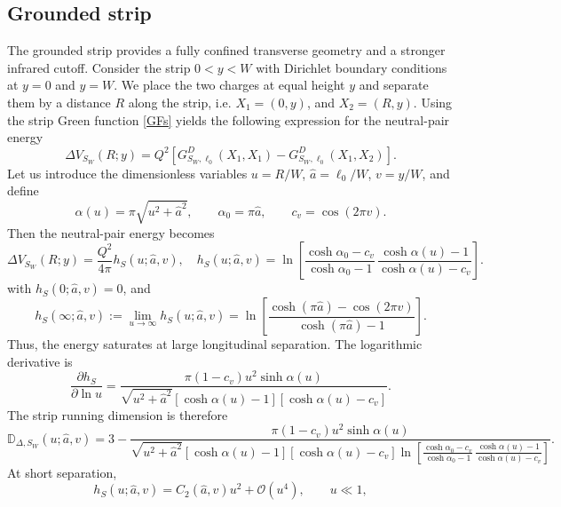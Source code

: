 \documentclass[openacc]{rsproca_new}%
\begin{document}
\subsection{Grounded strip}
\label{subsec:running_dimension_strip}

The grounded strip provides a fully confined transverse geometry and a stronger infrared cutoff. Consider the strip $0<y<W$ with Dirichlet boundary conditions at $y=0$ and $y=W$. We place the two charges at equal height $y$ and separate them by a distance $R$ along the strip, i.e. $X_1=(0,y)$, and $X_2=(R,y)$. Using the strip Green function \eqref{GFs} yields the following expression for the neutral-pair energy
\begin{equation}
  \Delta V_{S_W}(R;y)=Q^2\left[G_{S_W,\ell_0}^D(X_1,X_1)-G_{S_W,\ell_0}^D(X_1,X_2)\right].
\end{equation}
Let us introduce the dimensionless variables $u=R/W$, $\widehat{a}=\ell_0/W$, $v=y/W$, and define
\begin{equation}
  \alpha(u) = \pi\sqrt{u^2+\widehat{a}^2}, \qquad \alpha_0 = \pi \widehat{a},\qquad c_v = \cos(2\pi v).
\end{equation}
Then the neutral-pair energy becomes
\begin{equation}
  \Delta V_{S_W}(R;y)=\frac{Q^2}{4\pi}h_S(u;\widehat{a},v),\quad h_S(u;\widehat{a},v)=\ln\left[\frac{\cosh\alpha_0-c_v}{\cosh\alpha_0-1}\,\frac{\cosh\alpha(u)-1}{\cosh\alpha(u)-c_v}\right].
\end{equation}
with $h_S(0;\widehat{a},v)=0$, and
\begin{equation}
  h_S(\infty;\widehat{a},v):=\lim_{u\to\infty}h_S(u;\widehat{a},v)=\ln\left[\frac{\cosh(\pi \widehat{a})-\cos(2\pi v)}{\cosh(\pi \widehat{a})-1}\right].
\end{equation}
Thus, the energy saturates at large longitudinal separation. The logarithmic derivative is
\begin{equation}
  \frac{\partial h_S}{\partial\ln u}=\frac{\pi(1-c_v)u^2\sinh\alpha(u)}{\sqrt{u^2+\widehat{a}^2}[\cosh\alpha(u)-1][\cosh\alpha(u)-c_v]}.
\end{equation}
The strip running dimension is therefore
\begin{equation}
\mathbb D_{\Delta,S_W}(u;\widehat{a},v)=3-\frac{\pi(1-c_v)u^2\sinh\alpha(u)}{\sqrt{u^2+\widehat{a}^2}[\cosh\alpha(u)-1][\cosh\alpha(u)-c_v]\ln\left[\frac{\cosh\alpha_0-c_v}{\cosh\alpha_0-1}
\,\frac{\cosh\alpha(u)-1}{\cosh\alpha(u)-c_v}\right]}.
\end{equation}
At short separation,
\begin{equation}
h_S(u;\widehat{a},v)=C_2(\widehat{a},v)u^2+\mathcal{O}(u^4),\qquad u\ll1,
\end{equation}
\end{document}
